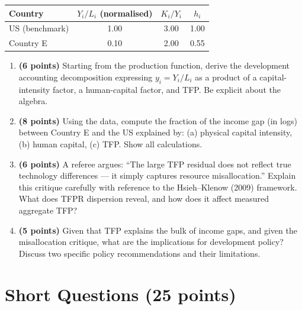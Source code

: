 \documentclass[a4paper,11pt]{article}
\begin{document}
\vspace{6pt}
\begin{center}
\begin{tabular}{lccc}
\toprule
Country & $Y_i/L_i$ (normalised) & $K_i/Y_i$ & $h_i$ \\
\midrule
US (benchmark) & 1.00 & 3.00 & 1.00 \\
Country E       & 0.10 & 2.00 & 0.55 \\
\bottomrule
\end{tabular}
\end{center}
\vspace{6pt}

\begin{enumerate}[label=\textbf{\arabic*.}, leftmargin=*, itemsep=10pt]

    \item \textbf{(6 points)} Starting from the production function, derive the development
    accounting decomposition expressing $y_i = Y_i/L_i$ as a product of a
    capital-intensity factor, a human-capital factor, and TFP. Be explicit about the
    algebra.

    \item \textbf{(8 points)} Using the data, compute the fraction of the income gap (in
    logs) between Country E and the US explained by: (a) physical capital intensity,
    (b) human capital, (c) TFP. Show all calculations.

    \item \textbf{(6 points)} A referee argues: ``The large TFP residual does not reflect
    true technology differences --- it simply captures resource misallocation.'' Explain
    this critique carefully with reference to the Hsieh--Klenow (2009) framework. What
    does TFPR dispersion reveal, and how does it affect measured aggregate TFP?

    \item \textbf{(5 points)} Given that TFP explains the bulk of income gaps, and given
    the misallocation critique, what are the implications for development policy? Discuss
    two specific policy recommendations and their limitations.

\end{enumerate}

\clearpage

\section{Short Questions \hfill (25 points)}
\end{document}
